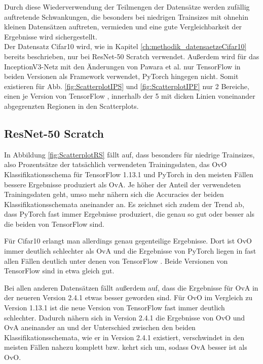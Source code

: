 Durch diese Wiederverwendung der Teilmengen der Datensätze werden zufällig auftretende Schwankungen, die besonders bei niedrigen Trainsizes mit ohnehin kleinen Datensätzen auftreten, vermieden und eine gute Vergleichbarkeit der Ergebnisse wird sichergestellt.\\

Der Datensatz Cifar10 \cite{cifar10} wird, wie in Kapitel \ref{ch:methodik_datensaetzeCifar10} bereits beschrieben, nur bei ResNet-50 Scratch verwendet. Außerdem wird für das InceptionV3-Netz mit den Änderungen von Pawara et al. \cite{pawaraWebsiteCode} nur TensorFlow \cite{tensorflow} in beiden Versionen als Framework verwendet, PyTorch \cite{pytorch} hingegen nicht. Somit existieren für Abb. \ref{fig:ScatterplotIPS} und \ref{fig:ScatterplotIPF} nur 2 Bereiche, einen je Version von TensorFlow \cite{tensorflow}, innerhalb der 5 mit dicken Linien voneinander abgegrenzten Regionen in den Scatterplots.


\subsection{ResNet-50 Scratch}
\label{ch:ergebnisseOvOOvA-RS}
In Abbildung \ref{fig:ScatterplotRS} fällt auf, dass besonders für niedrige Trainsizes, also Prozentsätze der tatsächlich verwendeten Trainingsdaten, das OvO Klassifikationsschema für TensorFlow 1.13.1 \cite{tensorflow} und PyTorch \cite{pytorch} in den meisten Fällen bessere Ergebnisse produziert als OvA. Je höher der Anteil der verwendeten Trainingsdaten geht, umso mehr nähern sich die Accuracies der beiden Klassifikationsschemata aneinander an. Es zeichnet sich zudem der Trend ab, dass PyTorch \cite{pytorch} fast immer Ergebnisse produziert, die genau so gut oder besser als die beiden von TensorFlow \cite{tensorflow} sind.


Für Cifar10 \cite{cifar10} erlangt man allerdings genau gegenteilige Ergebnisse. Dort ist OvO immer deutlich schlechter als OvA und die Ergebnisse von PyTorch \cite{pytorch} liegen in fast allen Fällen deutlich unter denen von TensorFlow \cite{tensorflow}. Beide Versionen von TensorFlow \cite{tensorflow} sind in etwa gleich gut.

Bei allen anderen Datensätzen fällt außerdem auf, dass die Ergebnisse für OvA in der neueren Version 2.4.1 etwas besser geworden sind. Für OvO im Vergleich zu Version 1.13.1 ist die neue Version von TensorFlow \cite{tensorflow} fast immer deutlich schlechter. Dadurch nähern sich in Version 2.4.1 die Ergebnisse von OvO und OvA aneinander an und der Unterschied zwischen den beiden Klassifikationsschemata, wie er in Version 2.4.1 existiert, verschwindet in den meisten Fällen nahezu komplett bzw. kehrt sich um, sodass OvA besser ist als OvO.


